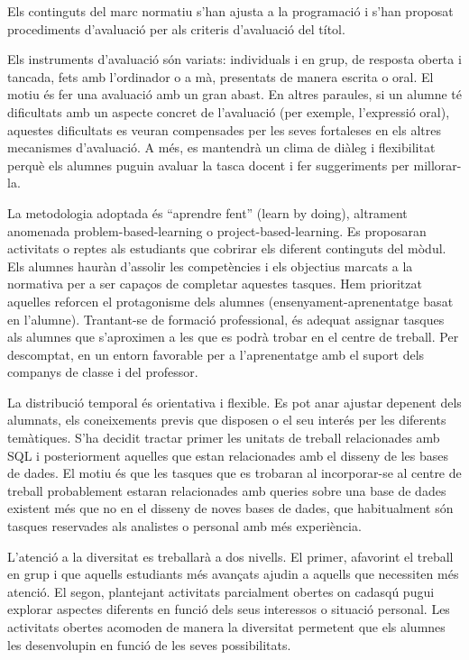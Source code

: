 \documentclass[catalan, a4paper, 12pt, titlepage]{article}
\begin{document}
Els continguts del marc normatiu s'han ajusta a la programació i s'han proposat procediments d'avaluació per als criteris d'avaluació del títol.

Els instruments d'avaluació són variats:
individuals i en grup,
de resposta oberta i tancada,
fets amb l'ordinador o a mà,
presentats de manera escrita o oral.
El motiu és fer una avaluació amb un gran abast.
En altres paraules, si un alumne té dificultats amb un aspecte concret de l'avaluació (per exemple, l'expressió oral), aquestes dificultats es veuran compensades per les seves fortaleses en els altres mecanismes d'avaluació.
A més, es mantendrà un clima de diàleg i flexibilitat perquè els alumnes puguin avaluar la tasca docent i fer suggeriments per millorar-la.

La metodologia adoptada és ``aprendre fent'' (learn by doing), altrament anomenada problem-based-learning o project-based-learning.
Es proposaran activitats o reptes als estudiants que cobrirar els diferent continguts del mòdul.
Els alumnes hauràn d'assolir les competències i els objectius marcats a la normativa per a ser capaços de completar aquestes tasques.
Hem prioritzat aquelles reforcen el protagonisme dels alumnes (ensenyament-aprenentatge basat en l'alumne).
Trantant-se de formació professional, és adequat assignar tasques als alumnes que s'aproximen a les que es podrà trobar en el centre de treball.
Per descomptat, en un entorn favorable per a l'aprenentatge amb el suport dels companys de classe i del professor.

La distribució temporal és orientativa i flexible.
Es pot anar ajustar depenent dels alumnats, els coneixements previs que disposen o el seu interés per les diferents temàtiques.
S'ha decidit tractar primer les unitats de treball relacionades amb SQL i posteriorment aquelles que estan relacionades amb el disseny de les bases de dades.
El motiu és que les tasques que es trobaran al incorporar-se al centre de treball probablement estaran relacionades amb queries sobre una base de dades existent més que no en el disseny de noves bases de dades, que habitualment són tasques reservades als analistes o personal amb més experiència.

L'atenció a la diversitat es treballarà a dos nivells.
El primer, afavorint el treball en grup i que aquells estudiants més avançats ajudin a aquells que necessiten més atenció.
El segon, plantejant activitats parcialment obertes on cadasqú pugui explorar aspectes diferents en funció dels seus interessos o situació personal.
Les activitats obertes acomoden de manera la diversitat permetent que els alumnes les desenvolupin en funció de les seves possibilitats.
\end{document}
